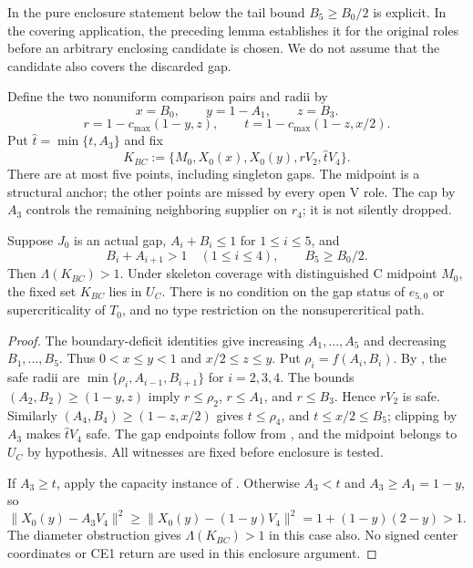In the pure enclosure statement below the tail bound $B_5\ge B_0/2$
is explicit. In the covering application, the preceding lemma establishes
it for the original roles before an arbitrary enclosing candidate is chosen.
We do not assume that the candidate also covers the discarded gap.

Define the two nonuniform comparison pairs and radii by
\[
 x=B_0,\qquad y=1-A_1,\qquad z=B_3.
\]
\[
 r=1-c_{\max}(1-y,z),\qquad t=1-c_{\max}(1-z,x/2).
\]
Put $\widehat t=\min\{t,A_3\}$ and fix
\[
 K_{BC}:=\{M_0,X_0(x),X_0(y),rV_2,\widehat tV_4\}.
\]
There are at most five points, including singleton gaps. The midpoint is a
structural anchor; the other points are missed by every open V role.
The cap by $A_3$
controls the remaining neighboring supplier on $r_4$; it is not silently dropped.



\begin{theorem}
\label{prop:new-nplus-one-all-vd0}
\label{lem:appendix-fixed-transverse}
Suppose $J_0$ is an actual gap, $A_i+B_i\le1$ for $1\le i\le5$, and
\[
 B_i+A_{i+1}>1\quad(1\le i\le4),\qquad B_5\ge B_0/2.
\]
Then $\Lambda(K_{BC})>1$. Under skeleton coverage with distinguished
C midpoint $M_0$, the fixed set $K_{BC}$ lies in $U_C$.
There is no condition on the gap status of $e_{5,0}$ or supercriticality
of $T_0$, and no type restriction on the nonsupercritical path.
\end{theorem}
\begin{proof}
The boundary-deficit identities give increasing $A_1,\ldots,A_5$ and
decreasing $B_1,\ldots,B_5$. Thus $0<x\le y<1$ and $x/2\le z\le y$.
Put $\rho_i=f(A_i,B_i)$. By ,
the safe radii are $\min\{\rho_i,A_{i-1},B_{i+1}\}$ for $i=2,3,4$.
The bounds $(A_2,B_2)\ge(1-y,z)$ imply
$r\le\rho_2$, $r\le A_1$, and $r\le B_3$. Hence $rV_2$ is safe.
Similarly $(A_4,B_4)\ge(1-z,x/2)$ gives $t\le\rho_4$, and
$t\le x/2\le B_5$; clipping by $A_3$ makes $\widehat tV_4$ safe.
The gap endpoints follow from , and the midpoint
belongs to $U_C$ by hypothesis. All witnesses are fixed before enclosure is tested.

If $A_3\ge t$, apply the capacity instance of . Otherwise $A_3<t$ and
$A_3\ge A_1=1-y$, so
\[
 \|X_0(y)-A_3V_4\|^2\ge
 \|X_0(y)-(1-y)V_4\|^2=1+(1-y)(2-y)>1.
\]
The diameter obstruction gives $\Lambda(K_{BC})>1$ in this case also.
No signed center coordinates or CE1 return are used in this enclosure argument.
\end{proof}


